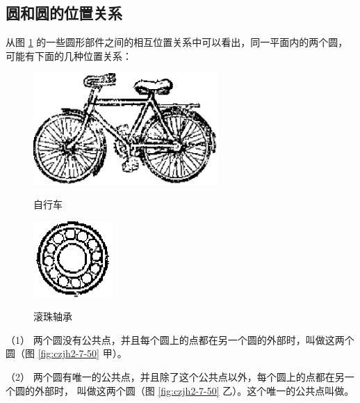 \subsection{圆和圆的位置关系}\label{subsec:czjh2-7-13}

从图 \ref{fig:czjh2-7-49} 的一些圆形部件之间的相互位置关系中可以看出，同一平面内的两个圆，可能有下面的几种位置关系：

\begin{figure}[htbp]
    \centering
    \begin{minipage}[b]{8cm}
        \centering
        \includegraphics[width=7cm]{../pic/czjh2-ch7-49-1.png}
        \caption*{自行车}
    \end{minipage}
    \begin{minipage}[b]{6cm}
        \centering
        \includegraphics[width=3cm]{../pic/czjh2-ch7-49-2.png}
        \caption*{滚珠轴承}
    \end{minipage}
    \caption{}\label{fig:czjh2-7-49}
\end{figure}

（1） 两个圆没有公共点，并且每个圆上的点都在另一个圆的外部时，叫做这两个圆（图 \ref{fig:czjh2-7-50} 甲）。

（2） 两个圆有唯一的公共点，并且除了这个公共点以外，每个圆上的点都在另一个圆的外部时，
叫做这两个圆（图 \ref{fig:czjh2-7-50} 乙）。这个唯一的公共点叫做。


